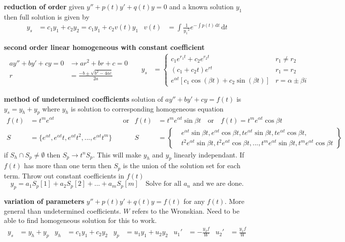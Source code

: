 \documentclass{article}
\begin{document}
\noindent
\textbf{reduction of order}
given $y''+p(t)y'+q(t)y=0$ and a known solution $y_1$ then full solution is given by
\begin{align*}
	y_s&=c_1y_1+c_2y_2=c_1y_1+c_2v(t)y_1 & v(t)&=\int{\frac{1}{{y_1}^2}e^{-\int{p(t)\,\mathrm{d}t}}\,\mathrm{d}t}
\end{align*}

\noindent
\textbf{second order linear homogeneous with constant coefficient}
\begin{align*}
\begin{aligned}
	ay''+by'+cy=0&\rightarrow ar^2+br+c=0 \\
	r&=\frac{-b\pm\sqrt{b^2-4ac}}{2a} 
\end{aligned}&&
	y_s&=
	\begin{cases}
		c_1e^{r_1t}+c_2e^{r_2t} & r_1\neq r_2\\
		(c_1+c_2t)e^{rt} & r_1=r_2\\
		e^{\alpha t}\left[c_1\cos(\beta t)+c_2\sin(\beta t)\right] & r=\alpha\pm\beta i
	\end{cases}
\end{align*}

\noindent
\textbf{method of undetermined coefficients}
solution of $ay''+by'+cy=f(t)$ is $y_s=y_h+y_p$ where $y_h$ is solution to corresponding homogeneous equation
\begin{align*}
	f(t)&=t^me^{\alpha t} &&\text{or}& f(t)&=t^me^{\alpha t}\sin \beta t  \quad\text{or}\quad f(t)=t^me^{\alpha t}\cos \beta t\\
	S&=\{e^{\alpha t},e^{\alpha t}t,e^{\alpha t}t^2,...,e^{\alpha t}t^m\} &&&
	S&=\left\{
	\begin{aligned}
		&e^{\alpha t}\sin\beta t,e^{\alpha t}\cos\beta t,
		te^{\alpha t}\sin\beta t,te^{\alpha t}\cos\beta t,\\
		&t^2e^{\alpha t}\sin\beta t, t^2e^{\alpha t}\cos\beta t,...,
		t^me^{\alpha t}\sin\beta t,t^me^{\alpha t}\cos\beta t
	\end{aligned}
	\right\}
\end{align*}
if $S_h\cap S_p\neq\emptyset$ then $S_p\rightarrow t^nS_p$. This will make $y_h$ and $y_p$ linearly independant. If $f(t)$ has more than one term then $S_p$ is the union of the solution set for each term. Throw out constant coefficients in $f(t)$
\[y_p=a_1S_p[1]+a_2S_p[2]+...+a_mS_p[m] \quad \text{Solve for all $a_n$ and we are done.}\]


\noindent
\textbf{variation of parameters}
$y''+p(t)y'+q(t)y=f(t)$ for any $f(t)$. More general than undetermined coefficients. $W$ refers to the Wronskian. Need to be able to find homogeneous solution for this to work.
\begin{align*}
	y_s&=y_h+y_p & y_h&=c_1y_1+c_2y_2 & y_p&=u_1y_1+u_2y_2 & {u_1}'&=-\frac{y_2f}{W} & {u_2}'&=\frac{y_1f}{W}
\end{align*}
\end{document}
